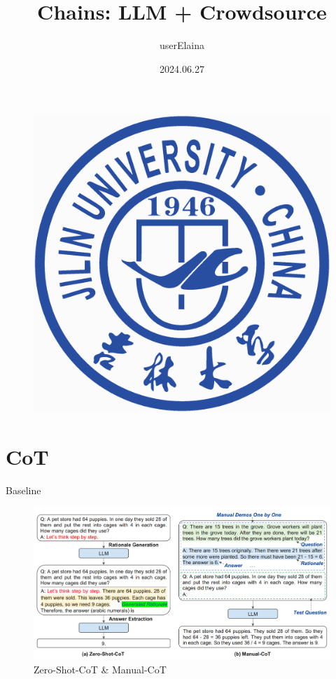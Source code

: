 \documentclass{beamer}
\author{userElaina}
\title{Chains: LLM + Crowdsource}
\institute{School of AI}
\date{2024.06.27}
\begin{document}
\kaishu
\begin{frame}
    \titlepage
    \begin{figure}[htpb]
        \begin{center}
            \includegraphics[width=0.15\linewidth]{pic/Jilin_University_Logo.eps}
        \end{center}
    \end{figure}
\end{frame}


\section{CoT}

\begin{frame}{Baseline}
    \begin{figure}[c]
        \centering
        \includegraphics[height=.7\textheight]{pic/6.png}
        \caption{Zero-Shot-CoT \& Manual-CoT}
    \end{figure}
\end{frame}
\end{document}
